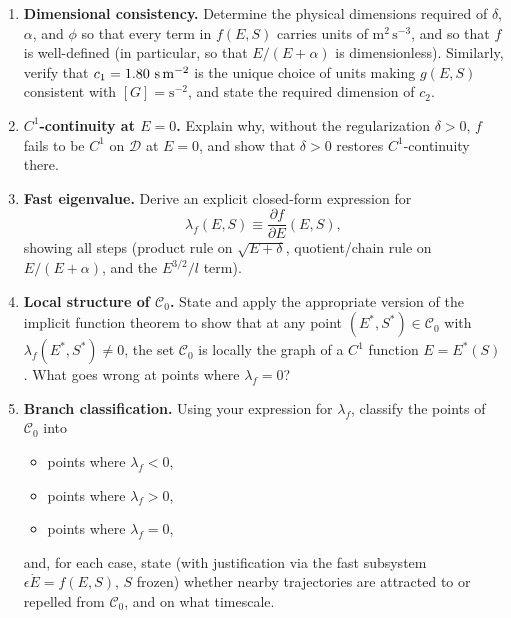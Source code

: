 \documentclass[11pt,fleqn]{article}
\begin{document}
\begin{enumerate}
    \item \textbf{Dimensional consistency.} Determine the physical dimensions required of $\delta$, $\alpha$, and $\phi$ so that every term in $f(E,S)$ carries units of $\text{m}^2\,\text{s}^{-3}$, and so that $f$ is well-defined (in particular, so that $E/(E+\alpha)$ is dimensionless). Similarly, verify that $c_1 = 1.80\ \text{s\,m}^{-2}$ is the unique choice of units making $g(E,S)$ consistent with $[G] = \text{s}^{-2}$, and state the required dimension of $c_2$.

    \item \textbf{$C^1$-continuity at $E=0$.} Explain why, without the regularization $\delta > 0$, $f$ fails to be $C^1$ on $\mathcal{D}$ at $E = 0$, and show that $\delta > 0$ restores $C^1$-continuity there.

    \item \textbf{Fast eigenvalue.} Derive an explicit closed-form expression for
    \begin{equation}
        \lambda_f(E,S) \equiv \frac{\partial f}{\partial E}(E,S),
    \end{equation}
    showing all steps (product rule on $\sqrt{E+\delta}$, quotient/chain rule on $E/(E+\alpha)$, and the $E^{3/2}/l$ term).

    \item \textbf{Local structure of $\mathcal{C}_0$.} State and apply the appropriate version of the implicit function theorem to show that at any point $(E^*,S^*) \in \mathcal{C}_0$ with $\lambda_f(E^*,S^*) \neq 0$, the set $\mathcal{C}_0$ is locally the graph of a $C^1$ function $E = E^*(S)$. What goes wrong at points where $\lambda_f = 0$?

    \item \textbf{Branch classification.} Using your expression for $\lambda_f$, classify the points of $\mathcal{C}_0$ into
    \begin{itemize}
        \item points where $\lambda_f < 0$,
        \item points where $\lambda_f > 0$,
        \item points where $\lambda_f = 0$,
    \end{itemize}
    and, for each case, state (with justification via the fast subsystem $\epsilon \dot E = f(E,S)$, $S$ frozen) whether nearby trajectories are attracted to or repelled from $\mathcal{C}_0$, and on what timescale.


\end{enumerate}
\end{document}
